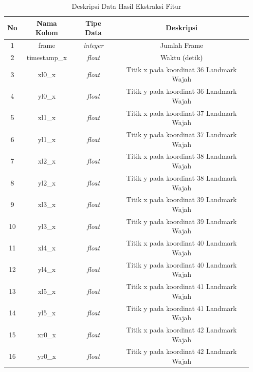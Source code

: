 \begin{longtable}{|c|c|c|c|}
  \caption{Deskripsi Data Hasil Ekstraksi Fitur}
  \label{tb:DeskripsiData}                                                                          \\
  \hline
  \rowcolor[HTML]{C0C0C0}
  \textbf{No} & \textbf{Nama Kolom} & \textbf{Tipe Data} & \textbf{Deskripsi}                       \\
  \hline
  1           & frame               & \textit{integer}   & Jumlah Frame                             \\
  2           & timestamp\_x        & \textit{float}     & Waktu (detik)                            \\
  3           & xl0\_x              & \textit{float}     & Titik x pada koordinat 36 Landmark Wajah \\
  4           & yl0\_x              & \textit{float}     & Titik y pada koordinat 36 Landmark Wajah \\
  5           & xl1\_x              & \textit{float}     & Titik x pada koordinat 37 Landmark Wajah \\
  6           & yl1\_x              & \textit{float}     & Titik y pada koordinat 37 Landmark Wajah \\
  7           & xl2\_x              & \textit{float}     & Titik x pada koordinat 38 Landmark Wajah \\
  8           & yl2\_x              & \textit{float}     & Titik y pada koordinat 38 Landmark Wajah \\
  9           & xl3\_x              & \textit{float}     & Titik x pada koordinat 39 Landmark Wajah \\
  10          & yl3\_x              & \textit{float}     & Titik y pada koordinat 39 Landmark Wajah \\
  11          & xl4\_x              & \textit{float}     & Titik x pada koordinat 40 Landmark Wajah \\
  12          & yl4\_x              & \textit{float}     & Titik y pada koordinat 40 Landmark Wajah \\
  13          & xl5\_x              & \textit{float}     & Titik x pada koordinat 41 Landmark Wajah \\
  14          & yl5\_x              & \textit{float}     & Titik y pada koordinat 41 Landmark Wajah \\
  15          & xr0\_x              & \textit{float}     & Titik x pada koordinat 42 Landmark Wajah \\
  16          & yr0\_x              & \textit{float}     & Titik y pada koordinat 42 Landmark Wajah \\

\end{longtable}

